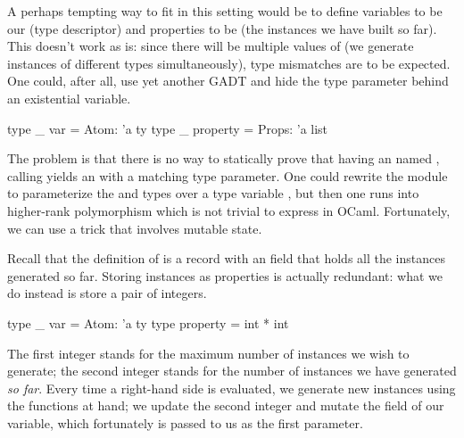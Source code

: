 A perhaps tempting way to fit in this setting would be to define variables to be
our  (type descriptor) and properties to be  (the
instances we have built so far). This doesn't work as is: since there will be
multiple values of  (we generate instances of different types
simultaneously), type mismatches are to be expected. One could, after all, use
yet another GADT and hide the  type parameter behind an existential
variable.
%
\begin{ocamlcode}
  type _ var = Atom: 'a ty
  type _ property = Props: 'a list
\end{ocamlcode}
%
The problem is that there is no way to statically prove that having an
 named , calling  yields an
 with a matching type parameter. One could rewrite the
 module to parameterize the  and  types over
a type variable , but then one runs into higher-rank polymorphism which
is not trivial to express in OCaml. Fortunately, we can use a trick that
involves mutable state.

Recall that the definition of  is a record with an  field
that holds all the instances generated so far. Storing instances as
properties is actually redundant: what we do instead is store a pair of
integers.
%
\begin{ocamlcode}
  type _ var = Atom: 'a ty
  type property = int * int
\end{ocamlcode}
%
The first integer stands for the maximum number of instances we wish to
generate; the second integer stands for the number of instances we have
generated \emph{so far}.
Every time a right-hand side is evaluated, we generate new instances using the
functions at hand; we update the second integer and mutate the  field
of our variable, which fortunately is passed to us as the first parameter.

